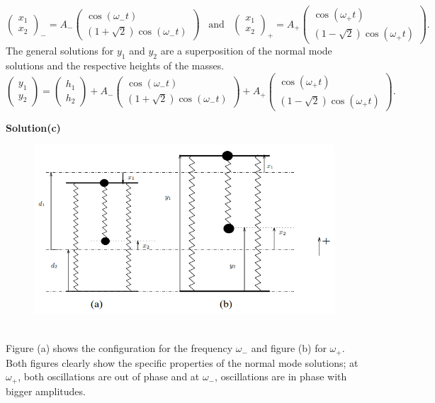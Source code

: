 \documentclass[12pt,a4paper]{article}
\begin{document}
\begin{equation}
    \begin{pmatrix}
    x_1\\
    x_2
\end{pmatrix}_-=A_-\begin{pmatrix}
    \cos(\omega_-t)\\
    \left(1+\sqrt{2}\right)\cos(\omega_-t)
\end{pmatrix}\,\,\,\,\,\text{and}\,\,\,\,\,\begin{pmatrix}
    x_1\\
    x_2
\end{pmatrix}_+=A_+\begin{pmatrix}
    \cos(\omega_+t)\\
    \left(1-\sqrt{2}\right)\cos(\omega_+t)
\end{pmatrix}.
\end{equation}
The general solutions for $y_1$ and $y_2$ are a superposition of the normal mode solutions and the respective heights of the masses.
\begin{equation}
    \begin{pmatrix}
    y_1\\
    y_2
\end{pmatrix}=\begin{pmatrix}
    h_1\\
    h_2
\end{pmatrix}+A_-\begin{pmatrix}
    \cos(\omega_-t)\\
    \left(1+\sqrt{2}\right)\cos(\omega_-t)
\end{pmatrix}+A_+\begin{pmatrix}
    \cos(\omega_+t)\\
    \left(1-\sqrt{2}\right)\cos(\omega_+t)
\end{pmatrix}.
\end{equation}

\textbf{Solution(c)}
\begin{figure}[h]
    \centering
    \includegraphics[width=0.8\linewidth]{figs/fig_sol_3.3c.png}
\end{figure}
\\Figure (a) shows the configuration for the frequency $\omega_-$ and figure (b) for $\omega_+$. Both figures clearly show the specific properties of the normal mode solutions; at $\omega_+$, both oscillations are out of phase and at $\omega_-$, oscillations are in phase with bigger amplitudes.
\newpage
\end{document}
